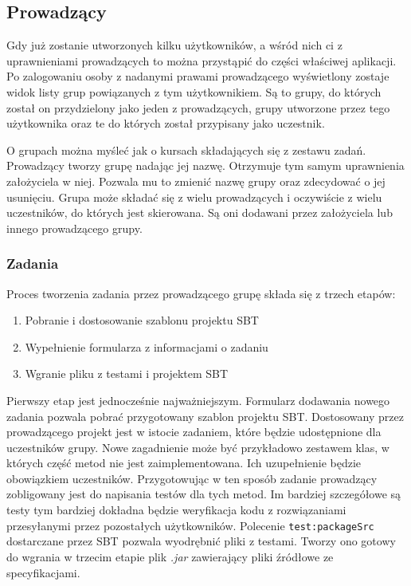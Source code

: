\documentclass[brudnopis]{xmgr}
\begin{document}
\subsection{Prowadzący}

Gdy już zostanie utworzonych kilku użytkowników, a wśród nich ci z uprawnieniami prowadzących to można przystąpić do części właściwej aplikacji. Po zalogowaniu osoby z nadanymi prawami prowadzącego wyświetlony zostaje widok listy grup powiązanych z tym użytkownikiem. Są to grupy, do których został on przydzielony jako jeden z prowadzących, grupy utworzone przez tego użytkownika oraz te do których został przypisany jako uczestnik. 

O grupach można myśleć jak o kursach składających się z zestawu zadań. Prowadzący tworzy grupę nadając jej nazwę. Otrzymuje tym samym uprawnienia założyciela w niej. Pozwala mu to zmienić nazwę grupy oraz zdecydować o jej usunięciu. Grupa może składać się z wielu prowadzących i oczywiście z wielu uczestników, do których jest skierowana. Są oni dodawani przez założyciela lub innego prowadzącego grupy.

\subsubsection{Zadania}

Proces tworzenia zadania przez prowadzącego grupę składa się z trzech etapów: 

\begin{enumerate}
\item Pobranie i dostosowanie szablonu projektu SBT
\item Wypełnienie formularza z informacjami o zadaniu
\item Wgranie pliku z testami i projektem SBT
\end{enumerate}

Pierwszy etap jest jednocześnie najważniejszym. Formularz dodawania nowego zadania pozwala pobrać przygotowany szablon projektu SBT. Dostosowany przez prowadzącego projekt jest w istocie zadaniem, które będzie udostępnione dla uczestników grupy. Nowe zagadnienie może być przykładowo zestawem klas, w których część metod nie jest zaimplementowana. Ich uzupełnienie będzie obowiązkiem uczestników. Przygotowując w ten sposób zadanie prowadzący zobligowany jest do napisania testów dla tych metod. Im bardziej szczegółowe są testy tym bardziej dokładna będzie weryfikacja kodu z rozwiązaniami przesyłanymi przez pozostałych użytkowników. Polecenie \texttt{test:packageSrc} dostarczane przez SBT pozwala wyodrębnić pliki z testami. Tworzy ono gotowy do wgrania w trzecim etapie plik \emph{.jar} zawierający pliki źródłowe ze specyfikacjami. 
\end{document}
